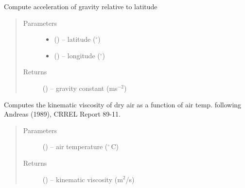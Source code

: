 \documentclass[letterpaper,10pt,english]{sphinxmanual}
\begin{document}
\begin{fulllineitems}
\label{\detokenize{index:util_subs.gc}}
Compute acceleration of gravity relative to latitude

\begin{quote}\begin{description}
\item[{Parameters}] \leavevmode\begin{itemize}
\item {} 
 (\href{https://docs.python.org/3/library/functions.html\#float}{}) -- latitude ($^\circ$)

\item {} 
 (\href{https://docs.python.org/3/library/functions.html\#float}{}) -- longitude ($^\circ$)

\end{itemize}

\item[{Returns}] \leavevmode
{} () -- gravity constant (ms$^{-2}$)

\end{description}\end{quote}

\end{fulllineitems}


\begin{fulllineitems}
\label{\detokenize{index:util_subs.visc_air}}
Computes the kinematic viscosity of dry air as a function of air temp.
following Andreas (1989), CRREL Report 89-11.
\begin{quote}\begin{description}
\item[{Parameters}] \leavevmode
{} (\href{https://docs.python.org/3/library/functions.html\#float}{}) -- air temperature ($^\circ$\,C)

\item[{Returns}] \leavevmode
{} (\href{https://docs.python.org/3/library/functions.html\#float}{}) -- kinematic viscosity (m$^2$/s)


\end{description}\end{quote}

\end{fulllineitems}
\end{document}
